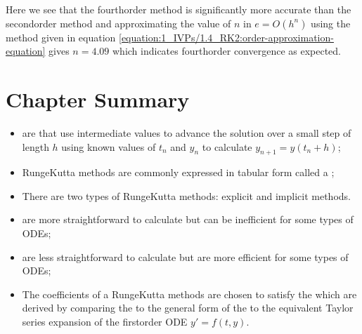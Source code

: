 \documentclass[letterpaper,10pt,english]{jupyterBook}
\begin{document}
\sphinxAtStartPar
Here we see that the fourth\sphinxhyphen{}order method is significantly more accurate than the second\sphinxhyphen{}order method and approximating the value of \(n\) in \(e = O(h^n)\) using the method given in equation \eqref{equation:1_IVPs/1.4_RK2:order-approximation-equation} gives \(n = 4.09\) which indicates fourth\sphinxhyphen{}order convergence as expected.

\sphinxstepscope


\section{Chapter Summary}
\label{\detokenize{2_ERKs/2.4_ERK_Summary:chapter-summary}}\label{\detokenize{2_ERKs/2.4_ERK_Summary::doc}}\begin{itemize}
\item {} 
\sphinxAtStartPar
{\hyperref[\detokenize{2_ERKs/2.0_ERKs:rk-definition}]{}} are  that use intermediate  values to advance the solution over a small step of length \(h\) using known values of \(t_n\) and \(y_n\) to calculate \(y_{n+1} = y(t_n+h)\);

\item {} 
\sphinxAtStartPar
Runge\sphinxhyphen{}Kutta methods are commonly expressed in tabular form called a {\hyperref[\detokenize{2_ERKs/2.0_ERKs:butcher-tableau-definition}]{}};

\item {} 
\sphinxAtStartPar
There are two types of Runge\sphinxhyphen{}Kutta methods: explicit and implicit methods.

\item {} 
\sphinxAtStartPar
{\hyperref[\detokenize{2_ERKs/2.0_ERKs:explicit-and-implicit-rk-methods-section}]{}} are more straightforward to calculate but can be inefficient for some types of ODEs;

\item {} 
\sphinxAtStartPar
{\hyperref[\detokenize{2_ERKs/2.0_ERKs:explicit-and-implicit-rk-methods-section}]{}} are less straightforward to calculate but are more efficient for some types of ODEs;

\item {} 
\sphinxAtStartPar
The coefficients of a Runge\sphinxhyphen{}Kutta methods are chosen to satisfy the  which are derived by comparing the {\hyperref[\detokenize{1_IVPs/1.1_Taylor_Series:taylor-series-definition}]{}} to the general form of the {\hyperref[\detokenize{2_ERKs/2.0_ERKs:rk-definition}]{}} to the equivalent Taylor series expansion of the first\sphinxhyphen{}order ODE \(y' = f(t,y)\).

\end{itemize}
\end{document}
